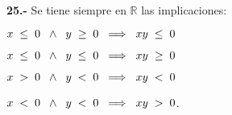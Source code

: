 \documentclass[12pt]{article}
\begin{document}
\textbf{25.-} Se tiene siempre en $\mathbb{R}$ las implicaciones: \vspace{0.2cm}

\hspace{4cm} $x\hspace{0.1cm} \leq \hspace{0.1cm}0\hspace{0.2cm}\wedge \hspace{0.2cm} y\hspace{0.1cm}\geq\hspace{0.1cm} 0 \hspace{0.2cm} \Longrightarrow \hspace{0.2cm} xy\hspace{0.1cm} \leq \hspace{0.1cm}0$ \vspace{0.2cm}

\hspace{4cm} $x\hspace{0.1cm} \leq \hspace{0.1cm}0\hspace{0.2cm}\wedge \hspace{0.2cm} y\hspace{0.1cm}\leq\hspace{0.1cm} 0 \hspace{0.2cm} \Longrightarrow \hspace{0.2cm} xy\hspace{0.1cm} \geq \hspace{0.1cm}0$ \vspace{0.2cm}

\hspace{4cm} $x\hspace{0.1cm} > \hspace{0.1cm}0\hspace{0.2cm}\wedge \hspace{0.2cm} y\hspace{0.1cm}<\hspace{0.1cm} 0 \hspace{0.2cm} \Longrightarrow \hspace{0.2cm} xy\hspace{0.1cm} < \hspace{0.1cm}0$ \vspace{0.2cm}

\hspace{4cm} $x\hspace{0.1cm} < \hspace{0.1cm}0\hspace{0.2cm}\wedge \hspace{0.2cm} y\hspace{0.1cm}<\hspace{0.1cm} 0 \hspace{0.2cm} \Longrightarrow \hspace{0.2cm} xy\hspace{0.1cm} > \hspace{0.1cm}0$. \vspace{0.2cm}
\end{document}
